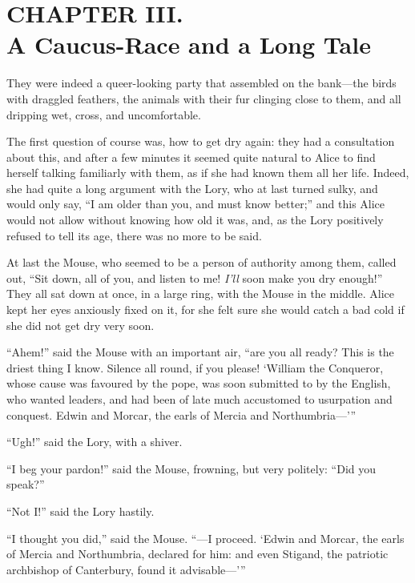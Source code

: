 \documentclass[11pt,openany,oneside]{book}
\begin{document}

\clearpage{}
{}
\chapter*{CHAPTER III.\\  A Caucus-Race and a Long Tale}
\leavevmode\hypertarget{d6.fp31850}{}They were indeed a queer-looking party that assembled on the bank—the birds with draggled feathers, the animals with their fur clinging close to them, and all dripping wet, cross, and uncomfortable. 

The first question of course was, how to get dry again: they had a consultation about this, and after a few minutes it seemed quite natural to Alice to find herself talking familiarly with them, as if she had known them all her life. Indeed, she had quite a long argument with the Lory, who at last turned sulky, and would only say, “I am older than you, and must know better;” and this Alice would not allow without knowing how old it was, and, as the Lory positively refused to tell its age, there was no more to be said. 

At last the Mouse, who seemed to be a person of authority among them, called out, “Sit down, all of you, and listen to me! {\em I’ll\/} soon make you dry enough!” They all sat down at once, in a large ring, with the Mouse in the middle. Alice kept her eyes anxiously fixed on it, for she felt sure she would catch a bad cold if she did not get dry very soon. 

“Ahem!” said the Mouse with an important air, “are you all ready? This is the driest thing I know. Silence all round, if you please! ‘William the Conqueror, whose cause was favoured by the pope, was soon submitted to by the English, who wanted leaders, and had been of late much accustomed to usurpation and conquest. Edwin and Morcar, the earls of Mercia and Northumbria—’” 

“Ugh!” said the Lory, with a shiver. 

“I beg your pardon!” said the Mouse, frowning, but very politely: “Did you speak?” 

“Not I!” said the Lory hastily. 

“I thought you did,” said the Mouse. “—I proceed. ‘Edwin and Morcar, the earls of Mercia and Northumbria, declared for him: and even Stigand, the patriotic archbishop of Canterbury, found it advisable—’” 
\end{document}
